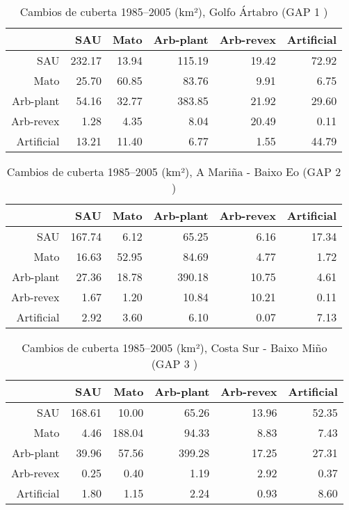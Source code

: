 \begin{table}[p]
\centering
\caption{Cambios de cuberta 1985--2005 (km²), Golfo Ártabro (GAP 1 )} 
\label{TaboaContinxGAP1}
\begin{tabular}{rrrrrr}
  \hline
 & SAU & Mato & Arb-plant & Arb-revex & Artificial \\ 
  \hline
SAU & 232.17 & 13.94 & 115.19 & 19.42 & 72.92 \\ 
  Mato & 25.70 & 60.85 & 83.76 & 9.91 & 6.75 \\ 
  Arb-plant & 54.16 & 32.77 & 383.85 & 21.92 & 29.60 \\ 
  Arb-revex & 1.28 & 4.35 & 8.04 & 20.49 & 0.11 \\ 
  Artificial & 13.21 & 11.40 & 6.77 & 1.55 & 44.79 \\ 
   \hline
\end{tabular}
\end{table}
\begin{table}[p]
\centering
\caption{Cambios de cuberta 1985--2005 (km²), A Mariña - Baixo Eo (GAP 2 )} 
\label{TaboaContinxGAP2}
\begin{tabular}{rrrrrr}
  \hline
 & SAU & Mato & Arb-plant & Arb-revex & Artificial \\ 
  \hline
SAU & 167.74 & 6.12 & 65.25 & 6.16 & 17.34 \\ 
  Mato & 16.63 & 52.95 & 84.69 & 4.77 & 1.72 \\ 
  Arb-plant & 27.36 & 18.78 & 390.18 & 10.75 & 4.61 \\ 
  Arb-revex & 1.67 & 1.20 & 10.84 & 10.21 & 0.11 \\ 
  Artificial & 2.92 & 3.60 & 6.10 & 0.07 & 7.13 \\ 
   \hline
\end{tabular}
\end{table}
\begin{table}[p]
\centering
\caption{Cambios de cuberta 1985--2005 (km²), Costa Sur - Baixo Miño (GAP 3 )} 
\label{TaboaContinxGAP3}
\begin{tabular}{rrrrrr}
  \hline
 & SAU & Mato & Arb-plant & Arb-revex & Artificial \\ 
  \hline
SAU & 168.61 & 10.00 & 65.26 & 13.96 & 52.35 \\ 
  Mato & 4.46 & 188.04 & 94.33 & 8.83 & 7.43 \\ 
  Arb-plant & 39.96 & 57.56 & 399.28 & 17.25 & 27.31 \\ 
  Arb-revex & 0.25 & 0.40 & 1.19 & 2.92 & 0.37 \\ 
  Artificial & 1.80 & 1.15 & 2.24 & 0.93 & 8.60 \\ 
   \hline
\end{tabular}
\end{table}
